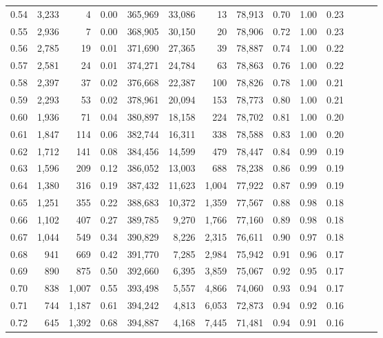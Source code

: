 \begin{tabular}{rrrrrrrrrrrrrr}
0.54 &  3,233 &      4 &  0.00 &  365,969 &   33,086 &      13 &  78,913 &  0.70 &  1.00 &      0.23 \\
0.55 &  2,936 &      7 &  0.00 &  368,905 &   30,150 &      20 &  78,906 &  0.72 &  1.00 &      0.23 \\
0.56 &  2,785 &     19 &  0.01 &  371,690 &   27,365 &      39 &  78,887 &  0.74 &  1.00 &      0.22 \\
0.57 &  2,581 &     24 &  0.01 &  374,271 &   24,784 &      63 &  78,863 &  0.76 &  1.00 &      0.22 \\
0.58 &  2,397 &     37 &  0.02 &  376,668 &   22,387 &     100 &  78,826 &  0.78 &  1.00 &      0.21 \\
0.59 &  2,293 &     53 &  0.02 &  378,961 &   20,094 &     153 &  78,773 &  0.80 &  1.00 &      0.21 \\
0.60 &  1,936 &     71 &  0.04 &  380,897 &   18,158 &     224 &  78,702 &  0.81 &  1.00 &      0.20 \\
0.61 &  1,847 &    114 &  0.06 &  382,744 &   16,311 &     338 &  78,588 &  0.83 &  1.00 &      0.20 \\
0.62 &  1,712 &    141 &  0.08 &  384,456 &   14,599 &     479 &  78,447 &  0.84 &  0.99 &      0.19 \\
0.63 &  1,596 &    209 &  0.12 &  386,052 &   13,003 &     688 &  78,238 &  0.86 &  0.99 &      0.19 \\
0.64 &  1,380 &    316 &  0.19 &  387,432 &   11,623 &   1,004 &  77,922 &  0.87 &  0.99 &      0.19 \\
0.65 &  1,251 &    355 &  0.22 &  388,683 &   10,372 &   1,359 &  77,567 &  0.88 &  0.98 &      0.18 \\
0.66 &  1,102 &    407 &  0.27 &  389,785 &    9,270 &   1,766 &  77,160 &  0.89 &  0.98 &      0.18 \\
0.67 &  1,044 &    549 &  0.34 &  390,829 &    8,226 &   2,315 &  76,611 &  0.90 &  0.97 &      0.18 \\
0.68 &    941 &    669 &  0.42 &  391,770 &    7,285 &   2,984 &  75,942 &  0.91 &  0.96 &      0.17 \\
0.69 &    890 &    875 &  0.50 &  392,660 &    6,395 &   3,859 &  75,067 &  0.92 &  0.95 &      0.17 \\
0.70 &    838 &  1,007 &  0.55 &  393,498 &    5,557 &   4,866 &  74,060 &  0.93 &  0.94 &      0.17 \\
0.71 &    744 &  1,187 &  0.61 &  394,242 &    4,813 &   6,053 &  72,873 &  0.94 &  0.92 &      0.16 \\
0.72 &    645 &  1,392 &  0.68 &  394,887 &    4,168 &   7,445 &  71,481 &  0.94 &  0.91 &      0.16 \\

\end{tabular}
